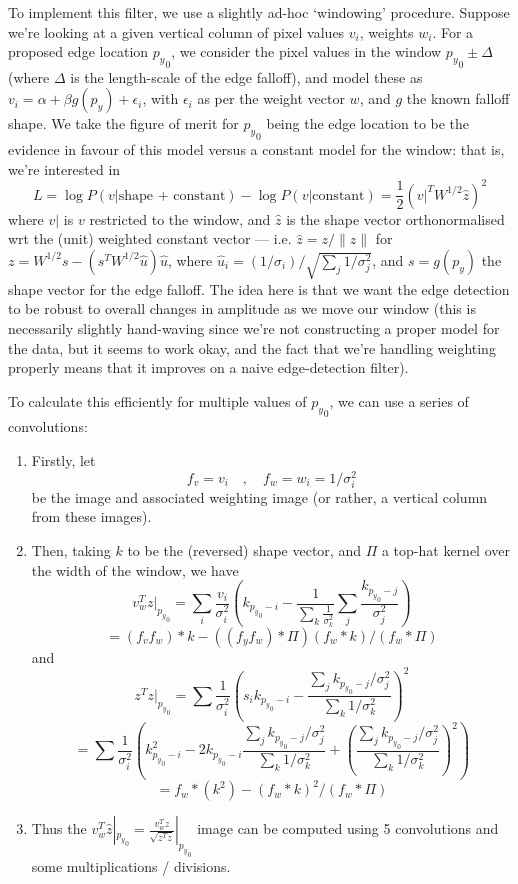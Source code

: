 To implement this filter, we use a slightly ad-hoc `windowing'
procedure. Suppose we're looking at a given vertical column of pixel
values $v_i$, weights $w_i$. For a proposed edge location ${p_y}_0$,
we consider the pixel values in the window ${p_y}_0 \pm \Delta$ (where
$\Delta$ is the length-scale of the edge falloff), and model these as
$v_i = \alpha + \beta g(p_y) + \epsilon_i$, with $\epsilon_i$ as per the
weight vector $w$, and $g$ the known falloff shape. We take the figure
of merit for ${p_y}_0$ being the edge location to be the evidence in
favour of this model versus a constant model for the window: that is,
we're interested in
\[
L = \log P(v|{\mbox{shape + constant}}) - \log P(v|{\mbox{constant}}) = \frac{1}{2} (v|^T W^{1/2} \hat z)^2
\]
where $v|$ is $v$ restricted to the window, and $\hat z$ is the shape
vector orthonormalised wrt the (unit) weighted constant vector --- i.e.
$\hat z = z / \| z \|$ for $z = W^{1/2} s - (s^T W^{1/2} \hat u) \hat
u$, where $\hat u_i = (1/\sigma_i) / \sqrt{\sum_j 1/\sigma_j^2}$, and $s
= g(p_y)$ the shape vector for the edge falloff. The idea here is that
we want the edge detection to be robust to overall changes in amplitude
as we move our window (this is necessarily slightly hand-waving since
we're not constructing a proper model for the data, but it seems to work
okay, and the fact that we're handling weighting properly means that it
improves on a naive edge-detection filter).

To calculate this efficiently for multiple values of ${p_y}_0$, we can
use a series of convolutions:
\begin{enumerate}
\item Firstly, let
\[
f_v = v_i \quad , \quad f_w = w_i = 1/\sigma_i^2
\]
be the image and associated weighting image (or rather, a vertical
column from these images).
%
\item Then, taking $k$ to be the (reversed) shape vector, and $\Pi$ a
top-hat kernel over the width of the window, we have
\[
v_w^T z |_{{p_y}_0} 
= \sum_i \frac{v_i}{\sigma_i^2} \left(k_{{p_y}_0-i} - \frac{1}{\sum_k \frac{1}{\sigma_k^2}}
\sum_j \frac{k_{{p_y}_0-j}}{\sigma_j^2}\right)
\]
\[
= (f_v f_w) * k - ((f_y f_w) * \Pi)(f_w * k) / (f_w * \Pi)
\]
and
\[
z^T z |_{{p_y}_0}
= 
\sum \frac{1}{\sigma_i^2}\left(s_i k_{{p_y}_0-i} - \frac{\sum_j k_{{p_y}_0-j}/\sigma_j^2}
{\sum_k 1/\sigma_k^2}\right)^2
\]
\[
=
\sum \frac{1}{\sigma_i^2}\left(k_{{p_y}_0-i}^2 - 2 k_{{p_y}_0-i} \frac{\sum_j k_{{p_y}_0-j}/\sigma_j^2}
{\sum_k 1/\sigma_k^2} + \left(\frac{\sum_j k_{{p_y}_0-j}/\sigma_j^2}
{\sum_k 1/\sigma_k^2}\right)^2\right)
\]
\[
 = f_w * (k^2) - (f_w * k)^2 / (f_w * \Pi)
\]
%
\item Thus the $v_w^T \hat z |_{{p_y}_0} = \frac{v_w^T z}{\sqrt{z^T z}}|_{{p_y}_0}$ image
can be computed using 5 convolutions and some multiplications / divisions.
\end{enumerate}

